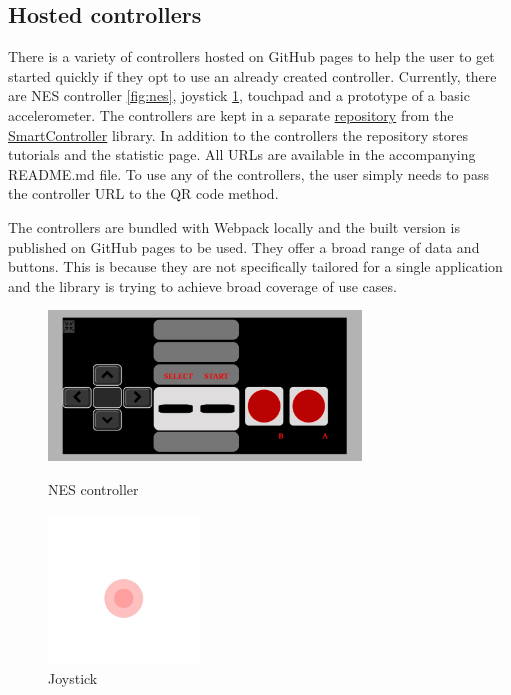 \documentclass{l4proj}
\begin{document}
\subsection{Hosted controllers}
There is a variety of controllers hosted on GitHub pages to help the user to get started quickly if they opt to use an already created controller. Currently, there are NES controller \ref{fig:nes}, joystick \ref{fig:joystick}, touchpad and a prototype of a basic accelerometer.  The controllers are kept in a separate \href{https://github.com/SmartControllerJS/Controllers}{repository} from the \href{https://github.com/SmartControllerJS/SmartController}{SmartController} library. In addition to the controllers the repository stores tutorials and the statistic page. All URLs are available in the accompanying README.md file. To use any of the controllers, the user simply needs to pass the controller URL to the QR code method. \par 
The controllers are bundled with Webpack locally and the built version is published on GitHub pages to be used. They offer a broad range of data and buttons. This is because they are not specifically tailored for a single application and the library is trying to achieve broad coverage of use cases. 

\begin{figure}[h!]
    \centering
    \begin{minipage}{0.45\textwidth}
        \centering
        \includegraphics[height=4cm]{./images/nes.jpg} %
        \caption{NES controller}
        \label{fig:nes}
    \end{minipage}\hfill
    \begin{minipage}{0.45\textwidth}
        \centering
        \includegraphics[height=4cm]{./images/joystick.jpg} %
        \caption{Joystick}
        \label{fig:joystick}
    \end{minipage}
\end{figure} 
\end{document}
